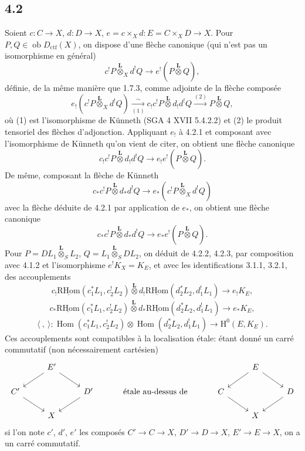 \documentclass[11pt]{article}
\renewcommand{\H}{\mathrm{H}}
\DeclareMathOperator{\Hom}{Hom}
\newcommand{\R}{\mathrm{R}}\newcommand{\RHomCore}{\mathrm{RHom}}
\newcommand{\ob}{\operatorname{ob}}
\providecommand{\RHom}{\RHomCore}
\providecommand{\uRHom}{\underline{\RHom}}
\providecommand{\Dctf}{D_{\mathrm{ctf}}}
\providecommand{\Dctf}{D_{\mathrm{ctf}}}
\providecommand{\RHom}{\RHomCore}
\providecommand{\Hom}{\operatorname{Hom}}
\providecommand{\ob}{\operatorname{ob}}
\providecommand{\RHom}{\R\mathcal{H}om}
\providecommand{\R}{\mathrm R}
\providecommand{\RHom}{\RHomCore}
\providecommand{\Hom}{\operatorname{Hom}}
\begin{document}
\subsection*{4.2}
Soient $c:C\to X$, $d:D\to X$, $e=c\times_Xd:E=C\times_XD\to X$. Pour $P,Q\in\ob\Dctf(X)$, on dispose d'une flèche canonique (qui n'est pas un isomorphisme en général)
\begin{equation}
c^!P\overset{\mathbf L}{\otimes}_X d^!Q
\longrightarrow e^!(P\overset{\mathbf L}{\otimes}Q),
\tag{4.2.1}
\end{equation}
définie, de la même manière que 1.7.3, comme adjointe de la flèche composée
\[
e_!(c^!P\overset{\mathbf L}{\otimes}_X d^!Q)
\xrightarrow[(1)]{\sim}
 c_!c^!P\overset{\mathbf L}{\otimes}d_!d^!Q
\xrightarrow{(2)} P\overset{\mathbf L}{\otimes}Q,
\]
où (1) est l'isomorphisme de Künneth (SGA 4 XVII 5.4.2.2) et (2) le produit tensoriel des flèches d'adjonction. Appliquant $e_!$ à 4.2.1 et composant avec l'isomorphisme de Künneth qu'on vient de citer, on obtient une flèche canonique
\begin{equation}
c_!c^!P\overset{\mathbf L}{\otimes}d_!d^!Q
\longrightarrow e_!e^!(P\overset{\mathbf L}{\otimes}Q).
\tag{4.2.2}
\end{equation}
De même, composant la flèche de Künneth
\[
c_*c^!P\overset{\mathbf L}{\otimes}d_*d^!Q
\longrightarrow e_*(c^!P\overset{\mathbf L}{\otimes}_X d^!Q)
\]
avec la flèche déduite de 4.2.1 par application de $e_*$, on obtient une flèche canonique
\begin{equation}
c_*c^!P\overset{\mathbf L}{\otimes}d_*d^!Q
\longrightarrow e_*e^!(P\overset{\mathbf L}{\otimes}Q).
\tag{4.2.3}
\end{equation}
Pour $P=DL_1\overset{\mathbf L}{\otimes}_S L_2$, $Q=L_1\overset{\mathbf L}{\otimes}_S DL_2$, on déduit de 4.2.2, 4.2.3, par composition avec 4.1.2 et l'isomorphisme $e^!K_X=K_E$, et avec les identifications 3.1.1, 3.2.1, des accouplements
\begin{equation}
c_!\uRHom(c_1^*L_1,c_2^!L_2)\overset{\mathbf L}{\otimes}
 d_!\uRHom(d_2^*L_2,d_1^!L_1)
\longrightarrow e_!K_E,
\tag{4.2.4}
\end{equation}
\begin{equation}
c_*\uRHom(c_1^*L_1,c_2^!L_2)\overset{\mathbf L}{\otimes}
 d_*\uRHom(d_2^*L_2,d_1^!L_1)
\longrightarrow e_*K_E,
\tag{4.2.4'}
\end{equation}
\begin{equation}
\langle\ ,\ \rangle:
\Hom(c_1^*L_1,c_2^!L_2)\otimes\Hom(d_2^*L_2,d_1^!L_1)
\longrightarrow \H^0(E,K_E).
\tag{4.2.5}
\end{equation}
Ces accouplements sont compatibles à la localisation étale: étant donné un carré commutatif (non nécessairement cartésien)
\[
\begin{tikzcd}[column sep=2.5em,row sep=1.5em]
& E' \arrow[dl] \arrow[dr] & && & E \arrow[dl] \arrow[dr] & \\
C' \arrow[dr] && D' \arrow[dl] & \text{ étale au-dessus de } & C \arrow[dr] && D \arrow[dl] \\
& X &&&& X &
\end{tikzcd}
\]
si l'on note $c'$, $d'$, $e'$ les composés $C'\to C\to X$, $D'\to D\to X$, $E'\to E\to X$, on a un carré commutatif.
\end{document}
